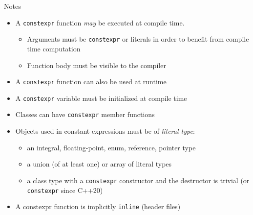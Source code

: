 \begin{frame}[fragile]
  \begin{block}{Notes}
    \begin{itemize}
    \item A \texttt{constexpr} function \emph{may} be executed at compile time.
    \begin{itemize}
      \item Arguments must be \texttt{constexpr} or literals in order to benefit from compile time computation
      \item Function body must be visible to the compiler
    \end{itemize}
    \item A \texttt{constexpr} function can also be used at runtime
    \item A \texttt{constexpr} variable must be initialized at compile time
    \item Classes can have \texttt{constexpr} member functions
    \item Objects used in constant expressions must be of \emph{literal type}:
      \begin{itemize}
      \item an integral, floating-point, enum, reference, pointer type
      \item a union (of at least one) or array of literal types
      \item a class type with a \texttt{constexpr} constructor and
            the destructor is trivial (or \texttt{constexpr} since C++20)
      \end{itemize}
    \item A constexpr function is implicitly \texttt{inline} (header files)
    \end{itemize}
  \end{block}
\end{frame}

